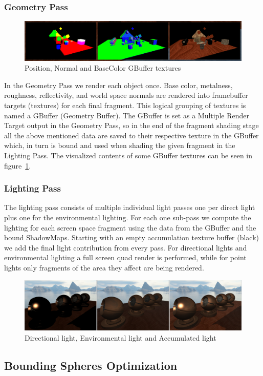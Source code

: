 \subsubsection{Geometry Pass}

\begin{figure}[ht]
    \centering
    \includegraphics[scale=0.3, clip=true]{./image/gbuffer.png}
    \caption{Position, Normal and BaseColor GBuffer textures}
\label{fig:gbuf}
\end{figure}

In the Geometry Pass we render each object once. Base color, metalness, roughness, reflectivity, and world space normals
are rendered into framebuffer targets (textures) for each final fragment. This logical grouping of textures is named
a GBuffer (Geometry Buffer). The GBuffer is set as a Multiple Render Target output in the Geometry Pass, so in the end
of the fragment shading stage all the above mentioned data are saved to their respective texture in the GBuffer which,
in turn is bound and used when shading the given fragment in the Lighting Pass. The visualized contents of some GBuffer
textures can be seen in figure~\ref{fig:gbuf}.

\subsubsection{Lighting Pass}

The lighting pass consists of multiple individual light passes one per direct light plus one for the
environmental lighting. For each one sub-pass we compute the lighting for each screen space fragment using
the data from the GBuffer and the bound ShadowMaps. Starting with an empty accumulation texture buffer (black)
we add the final light contribution from every pass. For directional lights and environmental lighting a full screen
quad render is performed, while for point lights only fragments of the area they affect are being rendered.

\begin{figure}[h]
    \centering
    \includegraphics[scale=0.18, clip=true]{./image/lightpasses.png}
    \caption{Directional light, Environmental light and Accumulated light}
\label{fig:lpasses}
\end{figure}

\subsection{Bounding Spheres Optimization}

